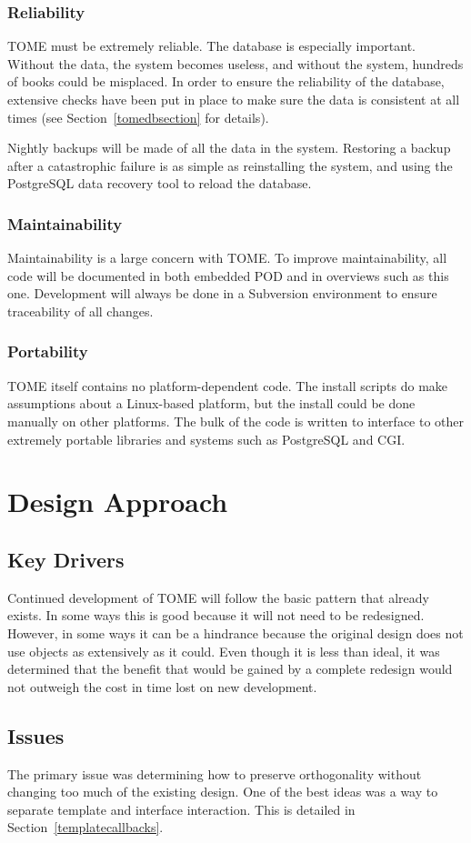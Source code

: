 \documentclass[12pt,titlepage]{article}
\begin{document}
\subsubsection{Reliability}
TOME must be extremely reliable.  The database is especially important.  Without the data, the system becomes useless, and without the system, hundreds of books could be misplaced.  In order to ensure the reliability of the database, extensive checks have been put in place to make sure the data is consistent at all times (see Section~\ref{tomedbsection} for details).

Nightly backups will be made of all the data in the system.  Restoring a backup after a catastrophic failure is as simple as reinstalling the system, and using the PostgreSQL data recovery tool to reload the database.
\subsubsection{Maintainability}
Maintainability is a large concern with TOME.  To improve maintainability, all code will be documented in both embedded POD and in overviews such as this one.  Development will always be done in a Subversion environment to ensure traceability of all changes.
\subsubsection{Portability}
TOME itself contains no platform-dependent code.  The install scripts do make assumptions about a Linux-based platform, but the install could be done manually on other platforms.  The bulk of the code is written to interface to other extremely portable libraries and systems such as PostgreSQL and CGI.
\section{Design Approach}
\subsection{Key Drivers}
Continued development of TOME will follow the basic pattern that already exists.  In some ways this is good because it will not need to be redesigned.  However, in some ways it can be a hindrance because the original design does not use objects as extensively as it could.  Even though it is less than ideal, it was determined that the benefit that would be gained by a complete redesign would not outweigh the cost in time lost on new development.
\subsection{Issues}
The primary issue was determining how to preserve orthogonality without changing too much of the existing design.  One of the best ideas was a way to separate template and interface interaction.  This is detailed in Section~\ref{templatecallbacks}.
\end{document}
